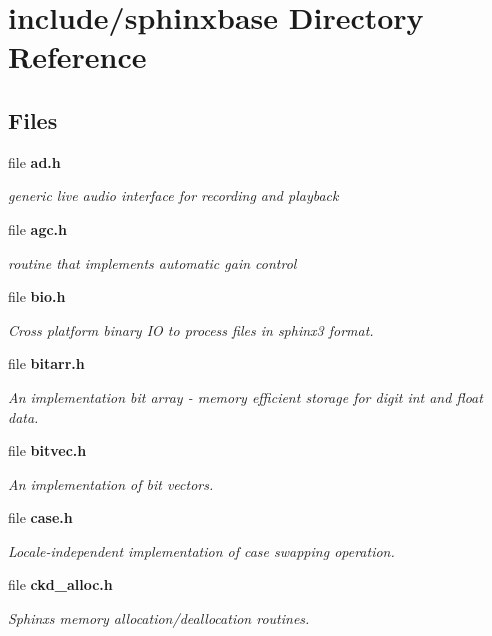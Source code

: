 \section{include/sphinxbase Directory Reference}
\label{dir_e3d154c296a8e9be2797a4f81e9375b2}
\subsection*{Files}
\begin{DoxyCompactItemize}
\item 
file \textbf{ ad.\+h}
\begin{DoxyCompactList}\small\item\em generic live audio interface for recording and playback \end{DoxyCompactList}\item 
file \textbf{ agc.\+h}
\begin{DoxyCompactList}\small\item\em routine that implements automatic gain control \end{DoxyCompactList}\item 
file \textbf{ bio.\+h}
\begin{DoxyCompactList}\small\item\em Cross platform binary IO to process files in sphinx3 format. \end{DoxyCompactList}\item 
file \textbf{ bitarr.\+h}
\begin{DoxyCompactList}\small\item\em An implementation bit array -\/ memory efficient storage for digit int and float data. \end{DoxyCompactList}\item 
file \textbf{ bitvec.\+h}
\begin{DoxyCompactList}\small\item\em An implementation of bit vectors. \end{DoxyCompactList}\item 
file \textbf{ case.\+h}
\begin{DoxyCompactList}\small\item\em Locale-\/independent implementation of case swapping operation. \end{DoxyCompactList}\item 
file \textbf{ ckd\+\_\+alloc.\+h}
\begin{DoxyCompactList}\small\item\em Sphinx\textquotesingle{}s memory allocation/deallocation routines. \end{DoxyCompactList}\item 

\end{DoxyCompactItemize}
